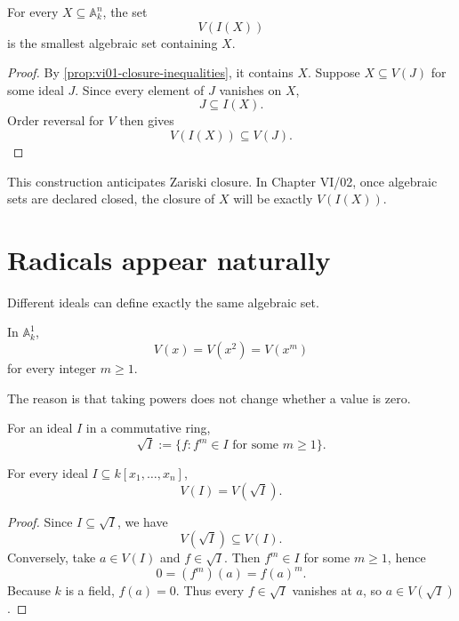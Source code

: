 \begin{proposition}
\label{prop:vi01-smallest-algebraic}
For every \(X\subseteq\mathbb A_k^n\), the set
\[
  V(I(X))
\]
is the smallest algebraic set containing \(X\).
\end{proposition}

\begin{proof}
By \cref{prop:vi01-closure-inequalities}, it contains \(X\).  Suppose
\(X\subseteq V(J)\) for some ideal \(J\).  Since every element of \(J\) vanishes on \(X\),
\[
  J\subseteq I(X).
\]
Order reversal for \(V\) then gives
\[
  V(I(X))\subseteq V(J).
\]
\end{proof}

This construction anticipates Zariski closure.  In Chapter VI/02, once algebraic sets
are declared closed, the closure of \(X\) will be exactly \(V(I(X))\).

\section{Radicals appear naturally}
\label{sec:vi01-radicals}

Different ideals can define exactly the same algebraic set.

\begin{example}
In \(\mathbb A_k^1\),
\[
  V(x)=V(x^2)=V(x^m)
\]
for every integer \(m\ge1\).
\end{example}

The reason is that taking powers does not change whether a value is zero.

\begin{definition}
For an ideal \(I\) in a commutative ring,
\[
  \sqrt I
  :=
  \{f: f^m\in I\text{ for some }m\ge1\}.
\]
\end{definition}

\begin{proposition}
\label{prop:vi01-radical-same-zero-set}
For every ideal \(I\subseteq k[x_1,\dots,x_n]\),
\[
  V(I)=V(\sqrt I).
\]
\end{proposition}

\begin{proof}
Since \(I\subseteq\sqrt I\), we have
\[
  V(\sqrt I)\subseteq V(I).
\]
Conversely, take \(a\in V(I)\) and \(f\in\sqrt I\).  Then \(f^m\in I\) for some
\(m\ge1\), hence
\[
  0=(f^m)(a)=f(a)^m.
\]
Because \(k\) is a field, \(f(a)=0\).  Thus every \(f\in\sqrt I\) vanishes at \(a\), so
\(a\in V(\sqrt I)\).
\end{proof}

